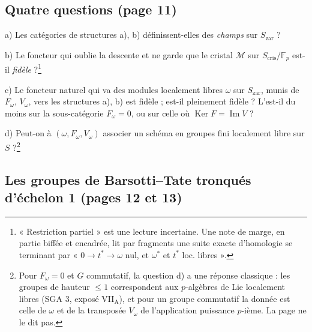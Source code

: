 \documentclass[11pt,a4paper]{article}
\begin{document}
\subsection*{Quatre questions (page 11)}

a) Les catégories de structures a), b) définissent-elles des \emph{champs}
sur $S_{\mathrm{zar}}$ ?

b) Le foncteur qui oublie la descente et ne garde que le cristal
$\mathcal{M}$ sur $S_{\mathrm{cris}}/\mathbb{F}_{p}$ est-il \emph{fidèle} ?\footnote{« Restriction
partiel » est une lecture incertaine. Une note de marge, en partie biffée et
encadrée, lit par fragments une suite exacte d'homologie se terminant par
« $0 \to t^{*} \to \omega$ nul, et $\omega^{*}$ et $t^{*}$ loc. libres ».}

c) Le foncteur naturel qui va des modules localement libres $\omega$ sur
$S_{\mathrm{zar}}$, munis de $F_{\omega}$, $V_{\omega}$, vers les structures
a), b) est fidèle ; est-il pleinement fidèle ? L'est-il du moins sur la
sous-catégorie $F_{\omega} = 0$, ou sur celle où
$\operatorname{Ker} F = \operatorname{Im} V$ ?

d) Peut-on à $(\omega, F_{\omega}, V_{\omega})$ associer un schéma en groupes
fini localement libre sur $S$ ?\footnote{Pour $F_{\omega} = 0$ et $G$
commutatif, la question d) a une réponse classique : les groupes de hauteur
$\le 1$ correspondent aux $p$-algèbres de Lie localement libres (SGA 3,
exposé VII$_{\mathrm{A}}$), et pour un groupe commutatif la donnée est celle
de $\omega$ et de la transposée $V_{\omega}$ de l'application puissance
$p$-ième. La page ne le dit pas.}

\subsection*{Les groupes de Barsotti--Tate tronqués d'échelon 1 (pages 12 et 13)}
\end{document}
